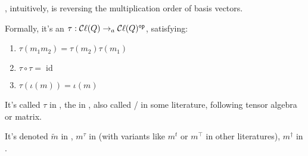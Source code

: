 \begin{definition}
    \label{reverse}
    \leanok

    , intuitively, is reversing the multiplication order of basis vectors.
    
    Formally, it's an  $\tau : \mathop{\mathcal{C}\ell}(Q) \to_{a} \mathop{\mathcal{C}\ell}(Q)^{\mathtt{op}}$, satisfying:

    \begin{enumerate}

    \item $\tau(m_1 m_2) = \tau(m_2) \tau(m_1)$
    \item $\tau \circ \tau = \operatorname{id}$
    \item $\tau(\iota(m)) = \iota(m)$
    
    \end{enumerate}

    It's called  $\tau$ in \cite{jadczyk2019notes}, the  in \cite{gallier2008clifford},
    also called / in some literature, following tensor algebra or matrix.

    It's denoted $\tilde{m}$ in \cite{lounesto2001clifford}, $m^\tau$ in \cite{jadczyk2019notes} (with variants like $m^t$ or $m^\top$ in other literatures), $m^\dagger$ in \cite{chisolm2012geometric}.

    \begin{figure}[H]
    \centering
    \end{figure}

\end{definition}

